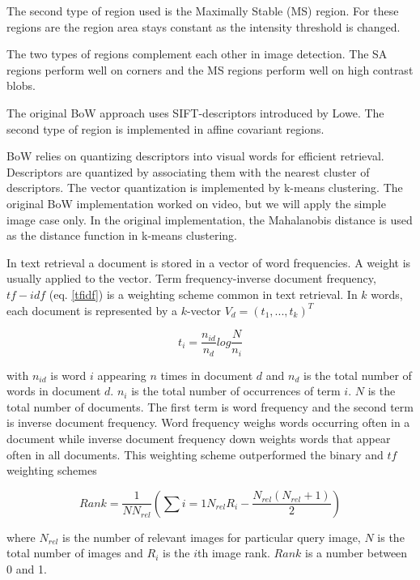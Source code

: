 \documentclass[english,12pt,a4paper,pdftex,elec,utf8]{aaltothesis}
\begin{document}
The second type of region used is the Maximally Stable (MS) region. For these regions are the region area stays constant as the intensity threshold is changed.

The two types of regions complement each other in image detection. The SA regions perform well on corners and the MS regions perform well on high contrast blobs. \cite{Sivic2003}

The original BoW approach uses SIFT-descriptors introduced by Lowe. The second type of region is implemented in affine covariant regions.

BoW relies on quantizing descriptors into visual words for efficient retrieval. Descriptors are quantized by associating them with the nearest cluster of descriptors. The vector quantization is implemented by k-means clustering. \cite{Sivic2003} The original BoW implementation worked on video, but we will apply the simple image case only. In the original implementation, the Mahalanobis distance is used as the distance function in k-means clustering.

In text retrieval a document is stored in a vector of word frequencies. A weight is usually applied to the vector. Term frequency-inverse document frequency, $tf-idf$ (eq. \ref{tfidf}) is a weighting scheme common in text retrieval. In $k$ words, each document is represented by a $k$-vector $V_{d}=(t_{1},...,t_{k})^{T}$

\begin{equation}\label{tfidf}
t_{i} = \frac{n_{id}}{n_{d}}log\frac{N}{n_{i}}
\end{equation}

with $n_{id}$ is word $i$ appearing $n$ times in document $d$ and $n_{d}$ is the total number of words in document $d$. $n_{i}$ is the total number of occurrences of term $i$. $N$ is the total number of documents. The first term is word frequency and the second term is inverse document frequency. Word frequency weighs words occurring often in a document while inverse document frequency down weights words that appear often in all documents. This weighting scheme outperformed the binary and $tf$ weighting schemes\cite{Sivic2003}

\begin{equation}\label{bowrank}
  Rank = \frac{1}{NN_{rel}}\left(\sum{i=1}{N_{rel}}R_{i}-\frac{N_{rel}(N_{rel} + 1)}{2}\right)
\end{equation}

where $N_{rel}$ is the number of relevant images for particular query image, $N$ is the total number of images and $R_{i}$ is the $i$th image rank. $Rank$ is a number between 0 and 1.
\end{document}
